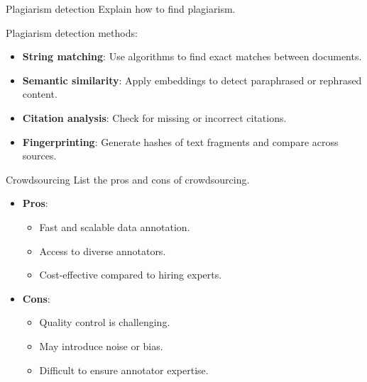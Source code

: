 \documentclass{article}
\begin{document}
\begin{exercise}{Plagiarism detection}
  Explain how to find plagiarism.

  \begin{solution}
    Plagiarism detection methods:
    \begin{itemize}
        \item \textbf{String matching}: Use algorithms to find exact matches between documents.
        \item \textbf{Semantic similarity}: Apply embeddings to detect paraphrased or rephrased content.
        \item \textbf{Citation analysis}: Check for missing or incorrect citations.
        \item \textbf{Fingerprinting}: Generate hashes of text fragments and compare across sources.
    \end{itemize}
  \end{solution}
\end{exercise}

\begin{exercise}{Crowdsourcing}
  List the pros and cons of crowdsourcing.

  \begin{solution}
    \begin{itemize}
        \item \textbf{Pros}:
        \begin{itemize}
            \item Fast and scalable data annotation.
            \item Access to diverse annotators.
            \item Cost-effective compared to hiring experts.
        \end{itemize}
        \item \textbf{Cons}:
        \begin{itemize}
            \item Quality control is challenging.
            \item May introduce noise or bias.
            \item Difficult to ensure annotator expertise.
        \end{itemize}
    \end{itemize}
  \end{solution}
\end{exercise}
\end{document}

